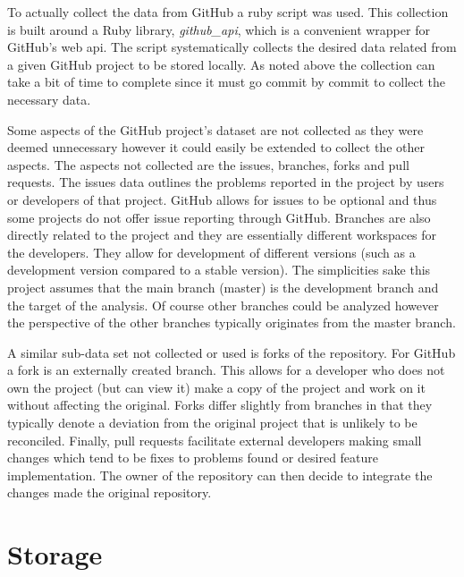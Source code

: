 To actually collect the data from GitHub a ruby script was used. This collection is built around a Ruby library, \textit{github\_api}, which is a convenient wrapper for GitHub's web \gls{api}. The script systematically collects the desired data related from a given GitHub project to be stored locally. As noted above the collection can take a bit of time to complete since it must go commit by commit to collect the necessary data.

Some aspects of the GitHub project's dataset are not collected as they were deemed unnecessary however it could easily be extended to collect the other aspects. The aspects not collected are the issues, branches, forks and pull requests. The issues data outlines the problems reported in the project by users or developers of that project. GitHub allows for issues to be optional and thus some projects do not offer issue reporting through GitHub. Branches are also directly related to the project and they are essentially different workspaces for the developers. They allow for development of different versions (such as a development version compared to a stable version). The simplicities sake this project assumes that the main branch (master) is the development branch and the target of the analysis. Of course other branches could be analyzed however the perspective of the other branches typically originates from the master branch.

A similar sub-data set not collected or used is forks of the repository. For GitHub a fork is an externally created branch. This allows for a developer who does not own the project (but can view it) make a copy of the project and work on it without affecting the original. Forks differ slightly from branches in that they typically denote a deviation from the original project that is unlikely to be reconciled. Finally, pull requests facilitate external developers making small changes which tend to be fixes to problems found or desired feature implementation. The owner of the repository can then decide to integrate the changes made the original repository.



\section{Storage}
\label{sec:storage}

